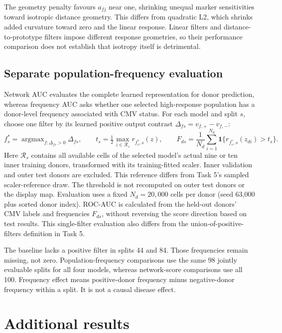 \documentclass[11pt,a4paper]{article}
\begin{document}
The geometry penalty favours $a_{fj}$ near one, shrinking unequal marker sensitivities toward isotropic distance geometry. This differs from quadratic L2, which shrinks added curvature toward zero and the linear response. Linear filters and distance-to-prototype filters impose different response geometries, so their performance comparison does not establish that isotropy itself is detrimental.

\subsection{Separate population-frequency evaluation}
Network AUC evaluates the complete learned representation for donor prediction, whereas frequency AUC asks whether one selected high-response population has a donor-level frequency associated with CMV status. For each model and split $s$, choose one filter by its learned positive output contrast $\Delta_{fs}=v_{f,+}-v_{f,-}$:
\[
f_s^*=\mathop{\arg\max}_{f:\Delta_{fs}>0}\Delta_{fs},\qquad
t_s=\tfrac12\max_{z\in\mathcal R_s}r_{f_s^*,s}(z),\qquad
F_{ds}=\frac1{N_d}\sum_{i=1}^{N_d}\mathbf1\{r_{f_s^*,s}(z_{di})>t_s\}.
\]
Here $\mathcal R_s$ contains all available cells of the selected model's actual nine or ten inner training donors, transformed with its training-fitted scaler. Inner validation and outer test donors are excluded. This reference differs from Task 5's sampled scaler-reference draw. The threshold is not recomputed on outer test donors or the display map. Evaluation uses a fixed $N_d=20{,}000$ cells per donor (seed 63,000 plus sorted donor index). ROC-AUC is calculated from the held-out donors' CMV labels and frequencies $F_{ds}$, without reversing the score direction based on test results. This single-filter evaluation also differs from the union-of-positive-filters definition in Task 5.

The baseline lacks a positive filter in splits 44 and 84. Those frequencies remain missing, not zero. Population-frequency comparisons use the same 98 jointly evaluable splits for all four models, whereas network-score comparisons use all 100. Frequency effect means positive-donor frequency minus negative-donor frequency within a split. It is not a causal disease effect.

\section{Additional results}
\end{document}
